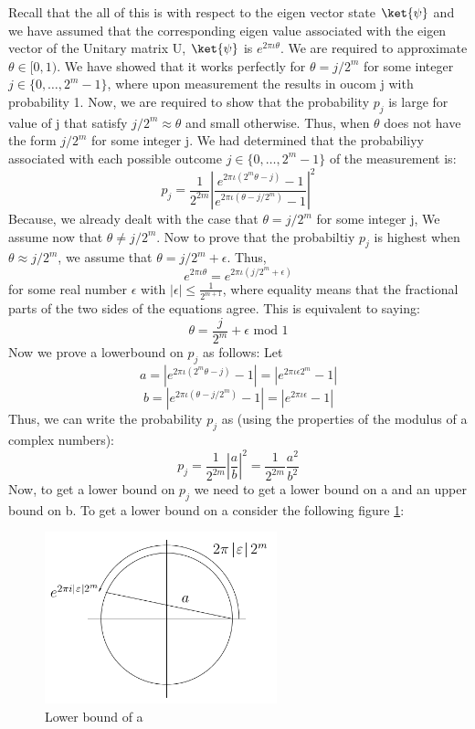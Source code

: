 \documentclass[12pt, oneside]{book}
\theoremstyle{definition}
\theoremstyle{definition}
\theoremstyle{remark}
\begin{document}
Recall that the all of this is with respect to the eigen vector state $\ket{\psi}$ and we have assumed that the corresponding eigen value associated with the eigen vector of the Unitary matrix U, $\ket{\psi}$ is $e^{2\pi\iota \theta}$.
We are required to approximate $\theta \in [0,1)$. We have showed that it works perfectly for $\theta=j/2^m$ for some integer $j\in \{0,\ldots,2^m-1\}$,
where upon measurement the results in oucom j with probability 1. Now, we are required to show that 
the probability $p_j$ is large for value of j that satisfy $j/2^m\approx \theta$ and small otherwise. Thus, when $\theta$ does not
have the form $j/2^m$ for some integer j. We had determined that the probabiliyy associated with each possible outcome $j \in \{0,\ldots,2^m-1\}$ of the measurement is:
\[
p_j=\frac{1}{2^{2m}}\left|\frac{e^{2\pi\iota(2^m\theta-j)}-1}{e^{2\pi\iota(\theta-j/2^m)}-1}\right|^2
\]
Because, we already dealt with the case that $\theta =j/2^m$ for some integer j, We assume now that $\theta \neq j/2^m$. 
Now to prove that the probabiltiy $p_j$ is highest when $\theta \approx j/2^m$, we assume that $\theta = j/2^m + \epsilon$. Thus,
\[
e^{2\pi\iota \theta}=e^{2\pi\iota (j/2^m+\epsilon)}
\]
for some real number $\epsilon$ with $|\epsilon|\leq \frac{1}{2^{m+1}}$, where equality means that the fractional parts of the two sides of the equations agree. This is equivalent to saying:
\[
\theta=\dfrac{j}{2^m}+\epsilon \text{ mod } 1
\]
Now we prove a lowerbound on $p_j$ as follows:
Let
\[
a=|e^{2\pi\iota (2^m\theta-j)}-1|=|e^{2\pi\iota \epsilon 2^m}-1|\]
\[
b=|e^{2\pi\iota(\theta-j/2^m)}-1|=|e^{2\pi\iota\epsilon}-1|
\]
Thus, we can write the probability $p_j$ as (using the properties of the modulus of a complex numbers):
\[
p_j=\frac{1}{2^{2m}}\left|\frac{a}{b}\right|^2=\frac{1}{2^{2m}}\frac{a^2}{b^2}
\]
Now, to get a lower bound on $p_j$ we need to get a lower bound on a and an upper bound on b. To get a lower bound on a consider the following figure \ref{fig:phaseestimation4}:
\begin{figure}[H]
    \centering
    \includegraphics[width=0.6\textwidth]{../images/phaseest4.png}
    \caption{Lower bound of a}
    \label{fig:phaseestimation4}
\end{figure}
\end{document}
